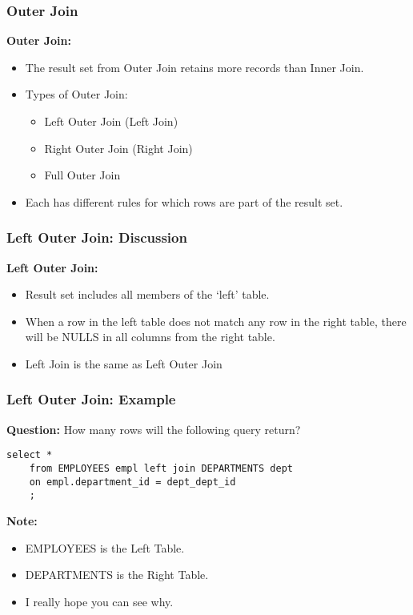 \documentclass{beamer}
\begin{document}
\begin{frame} %
  \frametitle{Outer Join}

  \textbf{Outer Join:}

  \begin{itemize}
  \item The result set from Outer Join retains more records than Inner
    Join.
  \item Types of Outer Join:
    \begin{itemize}
    \item Left Outer Join (Left Join)
    \item Right Outer Join (Right Join)
    \item Full Outer Join
    \end{itemize}
  \item Each has different rules for which rows are part of the result set.
  \end{itemize}
\end{frame}

\begin{frame} %
  \frametitle{Left Outer Join: Discussion}

  \textbf{Left Outer Join:}

  \begin{itemize}
  \item Result set includes all members of the `left' table.
  \item When a row in the left table does not match any row in the
    right table, there will be NULLS in all columns from the right
    table.
  \item Left Join is the same as Left Outer Join
  \end{itemize}
\end{frame}

\begin{frame}[fragile] %
  \frametitle{Left Outer Join: Example} 
  
  \textbf{Question:} How many rows will the following query return?
  \bigskip

  \begin{lstlisting}[title={\tiny Source: https://github.com/Choens/sql-survival-guide/blob/master/sql/04-joins/left-join.sql}]
    select *
    from EMPLOYEES empl left join DEPARTMENTS dept
    on empl.department_id = dept_dept_id
    ;
  \end{lstlisting}
  
  \bigskip
  \textbf{Note: }
  \begin{itemize}
  \item EMPLOYEES is the Left Table.
  \item DEPARTMENTS is the Right Table.
  \item I really hope you can see why.
  \end{itemize}
  
\end{frame}
\end{document}
